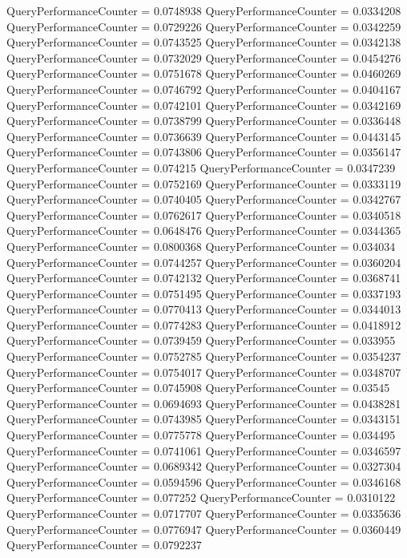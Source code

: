 \documentclass[9pt]{article}
\theoremstyle{plain}
\theoremstyle{definition}
\theoremstyle{remark}
\numberwithin{equation}{section}
\begin{document}
QueryPerformanceCounter  =  0.0748938
QueryPerformanceCounter  =  0.0334208
QueryPerformanceCounter  =  0.0729226
QueryPerformanceCounter  =  0.0342259
QueryPerformanceCounter  =  0.0743525
QueryPerformanceCounter  =  0.0342138
QueryPerformanceCounter  =  0.0732029
QueryPerformanceCounter  =  0.0454276
QueryPerformanceCounter  =  0.0751678
QueryPerformanceCounter  =  0.0460269
QueryPerformanceCounter  =  0.0746792
QueryPerformanceCounter  =  0.0404167
QueryPerformanceCounter  =  0.0742101
QueryPerformanceCounter  =  0.0342169
QueryPerformanceCounter  =  0.0738799
QueryPerformanceCounter  =  0.0336448
QueryPerformanceCounter  =  0.0736639
QueryPerformanceCounter  =  0.0443145
QueryPerformanceCounter  =  0.0743806
QueryPerformanceCounter  =  0.0356147
QueryPerformanceCounter  =  0.074215
QueryPerformanceCounter  =  0.0347239
QueryPerformanceCounter  =  0.0752169
QueryPerformanceCounter  =  0.0333119
QueryPerformanceCounter  =  0.0740405
QueryPerformanceCounter  =  0.0342767
QueryPerformanceCounter  =  0.0762617
QueryPerformanceCounter  =  0.0340518
QueryPerformanceCounter  =  0.0648476
QueryPerformanceCounter  =  0.0344365
QueryPerformanceCounter  =  0.0800368
QueryPerformanceCounter  =  0.034034
QueryPerformanceCounter  =  0.0744257
QueryPerformanceCounter  =  0.0360204
QueryPerformanceCounter  =  0.0742132
QueryPerformanceCounter  =  0.0368741
QueryPerformanceCounter  =  0.0751495
QueryPerformanceCounter  =  0.0337193
QueryPerformanceCounter  =  0.0770413
QueryPerformanceCounter  =  0.0344013
QueryPerformanceCounter  =  0.0774283
QueryPerformanceCounter  =  0.0418912
QueryPerformanceCounter  =  0.0739459
QueryPerformanceCounter  =  0.033955
QueryPerformanceCounter  =  0.0752785
QueryPerformanceCounter  =  0.0354237
QueryPerformanceCounter  =  0.0754017
QueryPerformanceCounter  =  0.0348707
QueryPerformanceCounter  =  0.0745908
QueryPerformanceCounter  =  0.03545
QueryPerformanceCounter  =  0.0694693
QueryPerformanceCounter  =  0.0438281
QueryPerformanceCounter  =  0.0743985
QueryPerformanceCounter  =  0.0343151
QueryPerformanceCounter  =  0.0775778
QueryPerformanceCounter  =  0.034495
QueryPerformanceCounter  =  0.0741061
QueryPerformanceCounter  =  0.0346597
QueryPerformanceCounter  =  0.0689342
QueryPerformanceCounter  =  0.0327304
QueryPerformanceCounter  =  0.0594596
QueryPerformanceCounter  =  0.0346168
QueryPerformanceCounter  =  0.077252
QueryPerformanceCounter  =  0.0310122
QueryPerformanceCounter  =  0.0717707
QueryPerformanceCounter  =  0.0335636
QueryPerformanceCounter  =  0.0776947
QueryPerformanceCounter  =  0.0360449
QueryPerformanceCounter  =  0.0792237
\end{document}
